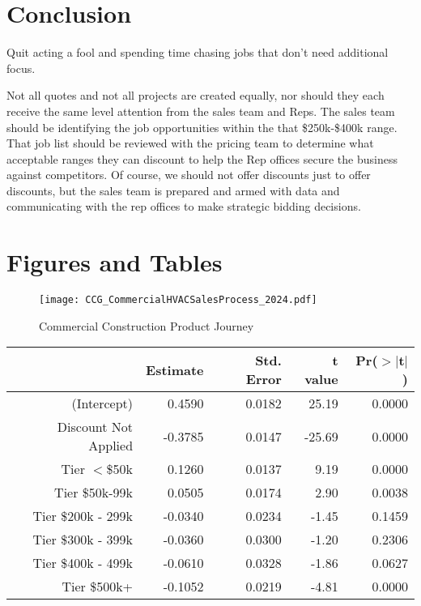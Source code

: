 \documentclass[12pt,english]{article}
\begin{document}
\section{Conclusion}
Quit acting a fool and spending time chasing jobs that don't need additional focus. 

Not all quotes and not all projects are created equally, nor should they each receive the same level attention from the sales team and Reps. The sales team should be identifying the job opportunities within the that \$250k-\$400k range. That job list should be reviewed with the pricing team to determine what acceptable ranges they can discount to help the Rep offices secure the business against competitors. Of course, we should not offer discounts just to offer discounts, but the sales team is prepared and armed with data and communicating with the rep offices to make strategic bidding decisions.


\newpage

\printbibliography

\newpage
\section*{Figures and Tables}\label{sec:figTables}
\begin{figure} [ht]
    \centering
    \texttt{[image: CCG\_CommercialHVACSalesProcess\_2024.pdf]}
    \caption{Commercial Construction Product Journey}
    \label{fig:enter-label}
\end{figure}


\begin{table}[ht]
\centering
\begin{tabular}{rrrrr}
  \hline
 & Estimate & Std. Error & t value & Pr($>$$|$t$|$) \\ 
  \hline
(Intercept) & 0.4590 & 0.0182 & 25.19 & 0.0000 \\ 
  Discount Not Applied & -0.3785 & 0.0147 & -25.69 & 0.0000 \\ 
  Tier $<$\$50k & 0.1260 & 0.0137 & 9.19 & 0.0000 \\
  Tier \$50k-99k & 0.0505 & 0.0174 & 2.90 & 0.0038 \\
  Tier \$200k - 299k & -0.0340 & 0.0234 & -1.45 & 0.1459 \\ 
  Tier \$300k - 399k & -0.0360 & 0.0300 & -1.20 & 0.2306 \\ 
  Tier \$400k - 499k & -0.0610 & 0.0328 & -1.86 & 0.0627 \\ 
  Tier \$500k+ & -0.1052 & 0.0219 & -4.81 & 0.0000 \\ 
   \hline
\end{tabular}
\end{table}
\end{document}
